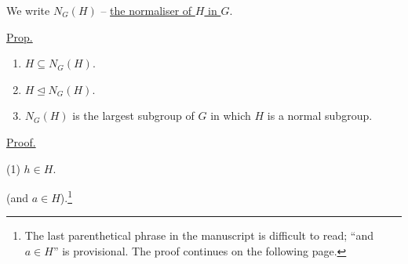 \medskip
\noindent We write $N_G(H)$ -- \underline{the normaliser of $H$ in $G$}.

\bigskip
\noindent\underline{Prop.}
\begin{enumerate}
\item[(1)] $H\subseteq N_G(H)$.
\item[(2)] $H\trianglelefteq N_G(H)$.
\item[(3)] $N_G(H)$ is the largest subgroup of $G$
 in which $H$ is a normal subgroup.
\end{enumerate}

\medskip
\noindent\underline{Proof.}

\noindent (1) \quad $h\in H$.

\noindent (and $a\in H$).\footnote{The last parenthetical phrase in the manuscript is difficult to read; ``and $a\in H$'' is provisional. The proof continues on the following page.}
